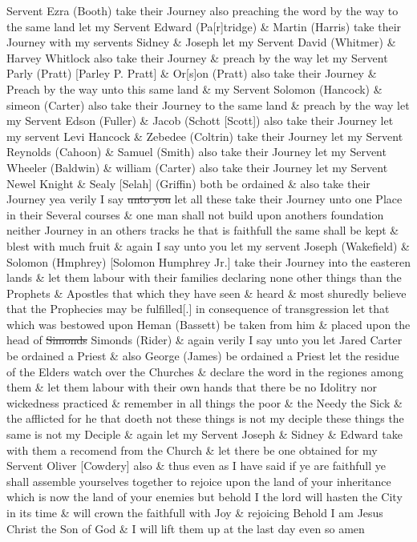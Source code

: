 Servent Ezra (Booth) take their Journey also preaching the word by the way to the same land let my Servent Edward (Pa[r]tridge) \& Martin (Harris) take their Journey with my servents Sidney \& Joseph let my Servent David (Whitmer) \& Harvey Whitlock also take their Journey \& preach by the way let my Servent Parly (Pratt) [Parley P. Pratt] \& Or[s]on (Pratt) also take their Journey \& Preach by the way unto this same land \& my Servent Solomon (Hancock) \& simeon (Carter) also take their Journey to the same land \& preach by the way let my Servent Edson (Fuller) \& Jacob (Schott [Scott]) also take their Journey let my servent Levi Hancock \& Zebedee (Coltrin) take their Journey let my Servent Reynolds (Cahoon) \& Samuel (Smith) also take their Journey let my Servent Wheeler (Baldwin) \& william (Carter) also take their Journey let my Servent Newel Knight \& Sealy [Selah] (Griffin) both be ordained \& also take their Journey yea verily I say \sout{unto you} let all these take their Journey unto one Place in their Several courses \& one man shall not build upon anothers foundation neither Journey in an others tracks he that is faithfull the same shall be kept \& blest with much fruit \& again I say unto you let my servent Joseph (Wakefield) \& Solomon (Hmphrey) [Solomon Humphrey Jr.] take their Journey into the easteren lands \& let them labour with their families declaring none other things than the Prophets \& Apostles that which they have seen \& heard \& most shuredly believe that the Prophecies may be fulfilled[.] in consequence of transgression let that which was bestowed upon Heman (Bassett) be taken from him \& placed upon the head of \sout{Simonds} Simonds (Rider) \& again verily I say unto you let Jared Carter be ordained a Priest \& also George (James) be ordained a Priest let the residue of the Elders watch over the Churches \& declare the word in the regiones among them \& let them labour with their own hands that there be no Idolitry nor wickedness practiced \& remember in all things the poor \& the Needy the Sick \& the afflicted for he that doeth not these things is not my deciple these things the same is not my Deciple \& again let my Servent Joseph \& Sidney \& Edward take with them a recomend from the Church \& let there be one obtained for my Servent Oliver [Cowdery] also \& thus even as I have said if ye are faithfull ye shall assemble yourselves together to rejoice upon the land of your inheritance which is now the land of your enemies but behold I the lord will hasten the City in its time \& will crown the faithfull with Joy \& rejoicing Behold I am Jesus Christ the Son of God \& I will lift them up at the last day even so amen
				
